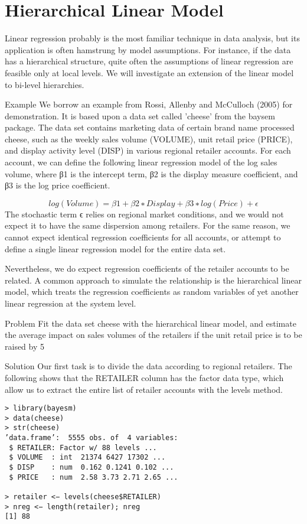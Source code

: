
\section{Hierarchical Linear Model}

Linear regression probably is the most familiar technique in data analysis, but its application is often hamstrung by model assumptions. For instance, if the data has a hierarchical structure, quite often the assumptions of linear regression are feasible only at local levels. We will investigate an extension of the linear model to bi-level hierarchies.

Example
We borrow an example from Rossi, Allenby and McCulloch (2005) for demonstration. It is based upon a data set called ’cheese’ from the baysem package. The data set contains marketing data of certain brand name processed cheese, such as the weekly sales volume (VOLUME), unit retail price (PRICE), and display activity level (DISP) in various regional retailer accounts. For each account, we can define the following linear regression model of the log sales volume, where β1 is the intercept term, β2 is the display measure coefficient, and β3 is the log price coefficient.

\[
log(Volume ) = β1 + β2 ∗Display+ β3 ∗ log(Price)+ ϵ
\]
The stochastic term ϵ relies on regional market conditions, and we would not expect it to have the same dispersion among retailers. For the same reason, we cannot expect identical regression coefficients for all accounts, or attempt to define a single linear regression model for the entire data set.

Nevertheless, we do expect regression coefficients of the retailer accounts to be related. A common approach to simulate the relationship is the hierarchical linear model, which treats the regression coefficients as random variables of yet another linear regression at the system level.

Problem
Fit the data set cheese with the hierarchical linear model, and estimate the average impact on sales volumes of the retailers if the unit retail price is to be raised by 5%

Solution
Our first task is to divide the data according to regional retailers. The following shows that the RETAILER column has the factor data type, which allow us to extract the entire list of retailer accounts with the levels method.
\begin{verbatim}
> library(bayesm) 
> data(cheese) 
> str(cheese) 
’data.frame’:  5555 obs. of  4 variables: 
 $ RETAILER: Factor w/ 88 levels ... 
 $ VOLUME  : int  21374 6427 17302 ... 
 $ DISP    : num  0.162 0.1241 0.102 ... 
 $ PRICE   : num  2.58 3.73 2.71 2.65 ... 
 
> retailer <− levels(cheese$RETAILER) 
> nreg <− length(retailer); nreg 
[1] 88
\end{verbatim}

